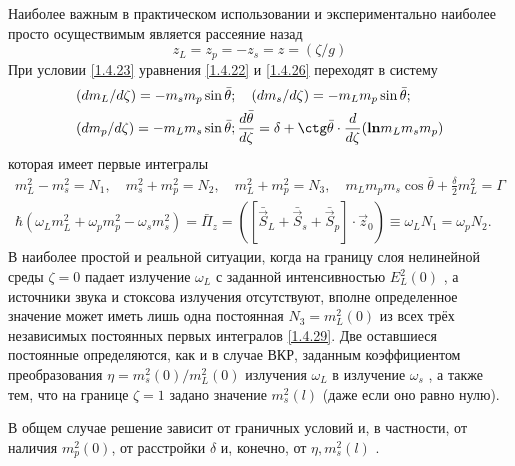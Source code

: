 \documentclass[a4paper]{article}
\begin{document}
Наиболее важным в практическом использовании и экспериментально наиболее просто осуществимым является рассеяние назад 
\begin{equation}
	z_{L}=z_{p}=-z_{s}=z=(\zeta/g)
	\label{1.4.27}
\end{equation}
При условии \eqref{1.4.23} уравнения \eqref{1.4.22} и \eqref{1.4.26} переходят в систему
\begin{equation}
	\begin{split}
		&(dm_{L}/d\zeta)=-m_{s}m_{p}\sin\bar{\theta};\quad(dm_{s}/d\zeta)=-m_{L}m_{p}\sin\bar{\theta};\\
		&(dm_{p}/d\zeta)=-m_{L}m_{s}\sin\bar{\theta};\frac{d\bar{\theta}}{d\zeta}=\delta+\ctg\bar{\theta}\cdot\frac{d}{d\zeta}(\textbf{ln}m_{L}m_{s}m_{p})
	\end{split}\label{1.4.28}
\end{equation}
которая имеет первые интегралы 
\begin{equation}
	\begin{split}
		m_{L}^{2}-m_{s}^{2}=N_{1},\quad m_{s}^{2}+m_{p}^{2}=N_{2},\quad m_{L}^{2}+m_{p}^{2}=N_{3},\quad m_{L}m_{p}m_{s}\cos\bar{\theta}+\frac{\delta}{2}m_{L}^{2}=\Gamma\\
		\hbar\left(\omega_{L}m_{L}^{2}+\omega_{p}m_{p}^{2}-\omega_{s}m_{s}^{2}\right)=\bar{\Pi}_{z}=\left(\left[\bar{\vec{S}}_{L}+\bar{\vec{S}}_{s}+\bar{\vec{S}}_{p}\right]\cdot\vec{z}_{0}\right)\equiv\omega_{L}N_{1}=\omega_{p}N_{2}.
	\end{split}\label{1.4.29}
\end{equation}
В наиболее простой и реальной ситуации, когда на границу слоя нелинейной среды $\zeta=0$  падает излучение $\omega_{L}$  с заданной интенсивностью $E_{L}^{2}(0)$ , а источники звука и стоксова излучения отсутствуют, вполне определенное значение может иметь лишь одна постоянная $N_{3}=m_{L}^{2}(0)$  из всех трёх независимых постоянных первых интегралов \eqref{1.4.29}. Две оставшиеся постоянные определяются, как и в случае ВКР, заданным коэффициентом преобразования $\eta=m_{s}^{2}(0)/m_{L}^{2}(0)$  излучения $\omega_{L}$   в излучение $\omega_{s}$ , а также тем, что на границе $\zeta=1$  задано значение  $m_{s}^{2}(l)$  (даже если оно равно нулю).

В общем случае решение зависит от граничных условий и, в частности, от наличия $m_{p}^{2}(0)$, от расстройки $\delta$  и, конечно, от $\eta,m_{s}^{2}(l)$ . 
\end{document}
